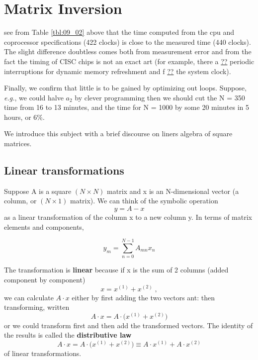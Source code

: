 
\section{Matrix Inversion}
 see from Table \ref{tbl:09_02} above that the time computed from the
cpu and coprocessor specifications (422 clocks) is close to the
measured time (440 clocks). The slight difference doubtless
comes both from measurement error and from the fact the
timing of CISC chips is not an exact art (for example, there a \underline{??}
periodic interruptions for dynamic memory refreshment and f \underline{??}
the system clock).

Finally, we confirm that little is to be gained by optimizing out
loops. Suppose, \textit{e.g.}, we could halve $a_2$ by clever programming
then we should cut the N = 350 time from 16 to 13 minutes, and 
the time for N = 1000 by some 20 minutes in 5 hours, or 6\%.

We introduce this subject with a brief discourse on liners
algebra of square matrices.

\subsection{Linear transformations}
Suppose A is a square $(N\times N)$ matrix and x is an N-dimensional
vector (a column, or $(N\times 1)$ matrix). We can think of the symbolic
operation
\begin{equation}
    \label{eq:09_26}
    y= A -x
\end{equation} 
as a linear transformation of the column x to a new column y. In
terms of matrix elements and components,

\begin{equation}
    \label{eq:09_27}
    y_m = \sum_{n=0}^{N-1} A_{mn} x_n
\end{equation}

The transformation is \textbf{linear} because if x is the sum of 2 columns
(added component by component)
\begin{equation}
    \label{eq:09_28}
    x=x^{(1)}+x^{(2)}\;,
\end{equation}
we can calculate $A \cdot x$ either by first adding the two vectors ant:
then transforming, written
\begin{equation}
    \label{eq:09_29}
    A \cdot x = A \cdot \Big( x^{(1)}+x^{(2)} \Big)
\end{equation}
or we could transform first and then add the transformed vectors.
The identity of the results is called the \textbf{distributive law}
\begin{equation}
    \label{eq:09_30}
    A \cdot x = A \cdot \Big( x^{(1)}+x^{(2)} \Big) \equiv   A \cdot x^{(1)}+ A \cdot x^{(2)} 
\end{equation}
of linear transformations.


